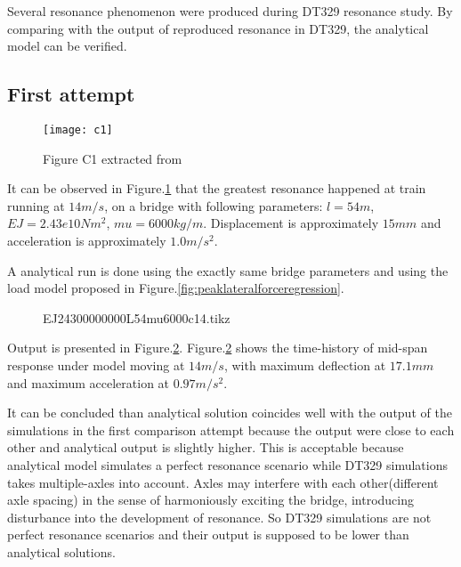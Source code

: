 Several resonance phenomenon were produced during DT329 resonance study. By comparing with the output of reproduced resonance in DT329, the analytical model can be verified.

\subsection{First attempt}

\begin{figure}[h!]
    \centering
    \texttt{[image: c1]}
    \caption{Figure C1 extracted from \cite{d181dt329} }
    \label{fig:c1}
\end{figure}

It can be observed in Figure.\ref{fig:c1} that the greatest resonance happened at train running at $14m/s$, on a bridge with following parameters: $l=54m$, $EJ=2.43e10Nm^2$, $mu=6000kg/m$. Displacement is approximately $15mm$ and acceleration is approximately $1.0m/s^2$.

A analytical run is done using the exactly same bridge parameters and using the load model proposed in Figure.\ref{fig:peaklateralforceregression}. 

\begin{figure}[h!]
\centering 
\newlength\figureheight 
\newlength\figurewidth 
\setlength\figureheight{6cm} 
\setlength\figurewidth{6cm} 
 
\caption{EJ24300000000L54mu6000c14.tikz} 
\label{fig:EJ24300000000L54mu6000c14} 
\end{figure}

Output is presented in Figure.\ref{fig:EJ24300000000L54mu6000c14}. Figure.\ref{fig:EJ24300000000L54mu6000c14} shows the time-history of mid-span response under model moving at $14m/s$, with maximum deflection at $17.1mm$ and maximum acceleration at $0.97 m/s^2$.

It can be concluded than analytical solution coincides well with the output of the simulations in the first comparison attempt because the output were close to each other and analytical output is slightly higher. This is acceptable because analytical model simulates a perfect resonance scenario while DT329 simulations takes multiple-axles into account. Axles may interfere with each other(different axle spacing) in the sense of harmoniously exciting the bridge, introducing disturbance into the development of resonance. So DT329 simulations are not perfect resonance scenarios and their output is supposed to be lower than analytical solutions.


